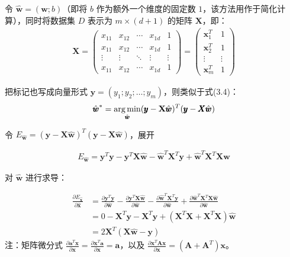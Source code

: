 \documentclass[../studies-ml.tex]{subfiles}
\begin{document}
\bigbreak

令 $\hat{\pmb{w}} = (\pmb{w}; b)$（即将 $b$ 作为额外一个维度的固定数 $1$，该方法用作于简化计算），同时将数据集 $D$ 表示为 $m \times (d + 1)$ 的矩阵
$\mathbf{X}$，即：
\begin{align*}
  \pmb{X} =
  \left(
  \begin{matrix}
      x_{11} & x_{12} & \cdots & x_{1d} & 1      \\
      x_{11} & x_{12} & \cdots & x_{1d} & 1      \\
      \vdots & \vdots & \ddots & \vdots & \vdots \\
      x_{11} & x_{12} & \cdots & x_{1d} & 1
    \end{matrix}
  \right) =
  \left(
  \begin{matrix}
      \pmb{x}_1^T & 1      \\
      \pmb{x}_2^T & 1      \\
      \vdots      & \vdots \\
      \pmb{x}_m^T & 1
    \end{matrix}
  \right)
\end{align*}

把标记也写成向量形式 $\pmb{y} = (y_1;y_2;\dots;y_m)$，则类似于式(3.4)：
\begin{equation}
  \hat{\pmb{w}}^* = \operatorname*{\arg\min}_{\hat{\pmb{w}}} (\pmb{y} - \mathbf{X}\hat{\pmb{w}})^T (\pmb{y} - \pmb{X}\hat{\pmb{w}})
\end{equation}

令 $E_{\hat{\pmb{w}}} = (\pmb{y} - \mathbf{X}\hat{\pmb{w}})^T (\pmb{y} - \pmb{X}\hat{\pmb{w}})$，展开

\begin{align*}
  E_{\hat{\pmb{w}}}=\pmb{y}^T\pmb{y}-\pmb{y}^T\pmb{X}\hat{\pmb{w}}-\hat{\pmb{w}}^T\pmb{X}^T\pmb{y}+\hat{\pmb{w}}^T\pmb{X}^T\pmb{X}\hat{\pmb{w}}
\end{align*}

对 $\hat{\pmb{w}}$ 进行求导：

\begin{equation}
  \begin{split}
    \frac{\partial E_{\hat{\pmb{x}}}}{\partial\hat{\pmb{x}}} & =
    \frac{\partial\pmb{y}^T\pmb{y}}{\partial\hat{\pmb{w}}} - \frac{\partial\pmb{y}^T\pmb{X}\hat{\pmb{w}}}{\partial\hat{\pmb{w}}} -
    \frac{\partial\hat{\pmb{w}}^T\pmb{X}^T\pmb{y}}{\partial\hat{\pmb{w}}} + \frac{\partial\hat{\pmb{w}}^T\pmb{X}^T\pmb{X}\hat{\pmb{w}}}{\partial\hat{\pmb{w}}} \\
    & = 0 - \pmb{X}^T\pmb{y} - \pmb{X}^T\pmb{y} + (\pmb{X}^T\pmb{X} + \pmb{X}^T\pmb{X})\hat{\pmb{w}} \\
    & = 2\pmb{X}^T(\pmb{X}\hat{\pmb{w}} - \pmb{y})
  \end{split}
\end{equation}
注：矩阵微分式 $\frac{\partial\pmb{a}^T\pmb{x}}{\partial\pmb{x}} = \frac{\partial\pmb{x}^T\pmb{a}}{\partial\pmb{x}} = \pmb{a}$，以及
$\frac{\partial\pmb{x}^T\pmb{A}\pmb{x}}{\partial\pmb{x}} = (\pmb{A} + \pmb{A}^T)\pmb{x}$。
\end{document}
